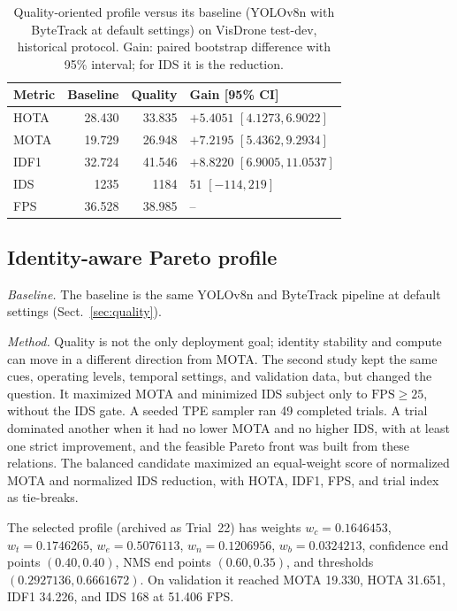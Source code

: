 \documentclass[pdflatex,sn-mathphys-num,iicol]{sn-jnl}
\begin{document}
\begin{table}[t]
\caption{Quality-oriented profile versus its baseline (YOLOv8n with ByteTrack
at default settings) on VisDrone test-dev, historical protocol. Gain: paired
bootstrap difference with 95\% interval; for IDS it is the reduction.}
\label{tab:quality}
\centering\footnotesize
\setlength{\tabcolsep}{4pt}
\begin{tabular}{@{}lrrl@{}}
\toprule
Metric & Baseline & Quality & Gain [95\% CI]\\
\midrule
HOTA & 28.430 & 33.835 & $+5.4051$ $[4.1273, 6.9022]$\\
MOTA & 19.729 & 26.948 & $+7.2195$ $[5.4362, 9.2934]$\\
IDF1 & 32.724 & 41.546 & $+8.8220$ $[6.9005, 11.0537]$\\
IDS & 1235 & 1184 & $51$ $[-114, 219]$\\
FPS & 36.528 & 38.985 & --\\
\bottomrule
\end{tabular}
\end{table}

\subsection{Identity-aware Pareto profile}\label{sec:identity}

\emph{Baseline.} The baseline is the same YOLOv8n and ByteTrack pipeline at
default settings (Sect.~\ref{sec:quality}).

\emph{Method.} Quality is not the only deployment goal; identity stability and
compute can move in a different direction from MOTA. The second study kept
the same cues, operating levels, temporal settings, and validation data, but
changed the question. It maximized MOTA and minimized IDS subject only to
$\mathrm{FPS}\geq25$, without the IDS gate. A seeded TPE sampler ran 49
completed trials. A trial dominated another when it had no lower MOTA and no
higher IDS, with at least one strict improvement, and the feasible Pareto
front was built from these relations. The balanced
candidate maximized an equal-weight score of normalized MOTA and normalized IDS
reduction, with HOTA, IDF1, FPS, and trial index as tie-breaks.

The selected profile (archived as Trial~22) has weights $w_c=0.1646453$,
$w_t=0.1746265$, $w_e=0.5076113$, $w_n=0.1206956$, $w_b=0.0324213$,
confidence end points $(0.40,0.40)$, NMS end points $(0.60,0.35)$, and
thresholds $(0.2927136, 0.6661672)$. On validation it reached MOTA 19.330,
HOTA 31.651, IDF1 34.226, and IDS 168 at 51.406 FPS.
\end{document}
